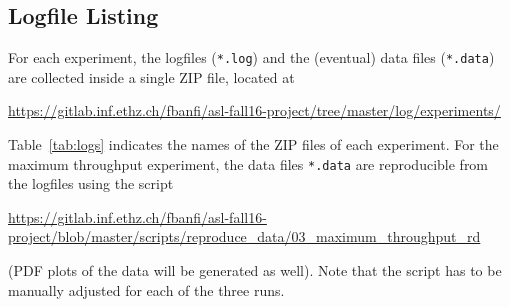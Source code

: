 \documentclass[11pt]{article}
\theoremstyle{definition}
\renewcommand\t\texttt
\begin{document}
\begin{appendices}
\section{Logfile Listing}

For each experiment, the logfiles (\t{*.log}) and the (eventual) data files (\t{*.data}) are collected inside a single ZIP file, located at
\begin{center}
    \url{https://gitlab.inf.ethz.ch/fbanfi/asl-fall16-project/tree/master/log/experiments/}
\end{center}
Table~\ref{tab:logs} indicates the names of the ZIP files of each experiment.
For the maximum throughput experiment, the data files \t{*.data} are reproducible from the logfiles using the script
\begin{center}
    \url{https://gitlab.inf.ethz.ch/fbanfi/asl-fall16-project/blob/master/scripts/reproduce_data/03_maximum_throughput_rd}\vspace{2mm}\\
\end{center}
(PDF plots of the data will be generated as well).
Note that the script has to be manually adjusted for each of the three runs.


\end{appendices}
\end{document}
